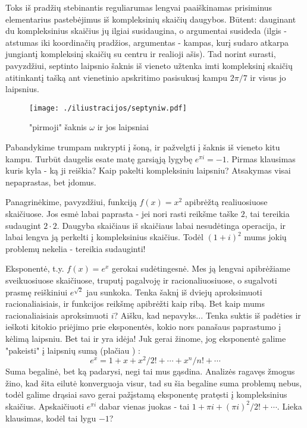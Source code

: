 Toks iš pradžių stebinantis reguliarumas lengvai paaiškinamas prisiminus elementarius pastebėjimus iš kompleksinių skaičių daugybos. Būtent: dauginant du kompleksinius skaičius jų ilgiai susidaugina, o argumentai susideda (ilgis - atstumas iki koordinačių pradžios, argumentas - kampas, kurį sudaro atkarpa jungiantį kompleksinį skaičių su centru ir realioji ašis). Tad norint surasti, pavyzdžiui, septinto laipsnio šaknis iš vieneto užtenka imti kompleksinį skaičių atitinkantį tašką ant vienetinio apskritimo pasisukusį kampu $2\pi /7$ ir visus jo laipsnius.

\begin{figure}[h!]
  \begin{center}
    \texttt{[image: ./iliustracijos/septyniw.pdf]}
  \end{center}
  \caption{"pirmoji" šaknis $\omega$ ir jos laipsniai}
\end{figure}

Pabandykime trumpam nukrypti į šoną, ir pažvelgti į šaknis iš vieneto kitu kampu. Turbūt daugelis esate matę garsiąją lygybę $e^{\pi i} = -1$. Pirmas klausimas kuris kyla - ką ji reiškia? Kaip pakelti kompleksiniu laipsniu? Atsakymas visai nepaprastas, bet įdomus.

Panagrinėkime, pavyzdžiui, funkciją $f(x) = x^2$ apibrėžtą realiuosiuose skaičiuose. Jos esmė labai paprasta - jei nori rasti reikšme taške $2$, tai tereikia sudaugint $2\cdot 2$. Daugyba skaičiaus iš skaičiaus labai nesudėtinga operacija, ir labai lengva ją perkelti į kompleksinius skaičius. Todėl $(1+i)^2$ mums jokių problemų nekelia - tereikia sudauginti!

Eksponentė, t.y. $f(x)=e^x$ gerokai sudėtingesnė. Mes ją lengvai apibrėžiame sveikuosiuose skaičiuose, truputį pagalvoję ir racionaliuosiuose, o sugalvoti prasmę reiškiniui $e^{\sqrt{2}}$ jau sunkoka. Tenka šaknį iš dviejų aproksimuoti racionaliaisiais, ir funkcijos reikšmę apibrėžti kaip ribą. Bet kaip mums racionaliaisiais aproksimuoti $i$? Aišku, kad nepavyks... Tenka suktis iš padėties ir ieškoti kitokio priėjimo prie eksponentės, kokio nors panašaus paprastumo į kėlimą laipsniu. Bet tai ir yra idėja! Juk gerai žinome, jog eksponentė galime "pakeisti" į laipsnių sumą (plačiau \cite{wikiT}) : $$e^x = 1 + x + x^2/2! + \cdots + x^n/n! + \cdots$$ Suma begalinė, bet ką padarysi, negi tai mus gąsdina. Analizės ragavęs žmogus žino, kad šita eilutė konverguoja visur, tad su šia begaline suma problemų nebus, todėl galime drąsiai savo gerai pažįstamą eksponentę pratęsti į kompleksinius skaičius. Apskaičiuoti $e^{\pi i}$ dabar vienas juokas - tai $1 + \pi i + (\pi i)^2/2! + \cdots$. Lieka klausimas, kodėl tai lygu $-1$?

